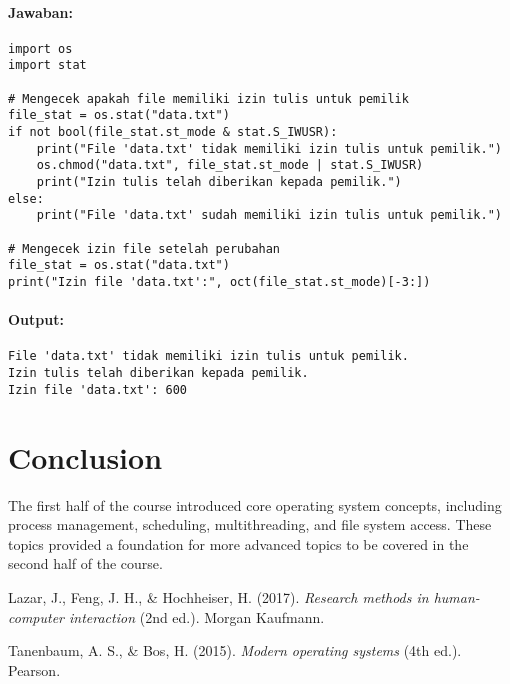 \documentclass[12pt]{article}
\begin{document}
\paragraph{Jawaban:}
\begin{verbatim}
import os
import stat

# Mengecek apakah file memiliki izin tulis untuk pemilik
file_stat = os.stat("data.txt")
if not bool(file_stat.st_mode & stat.S_IWUSR):
    print("File 'data.txt' tidak memiliki izin tulis untuk pemilik.")
    os.chmod("data.txt", file_stat.st_mode | stat.S_IWUSR)
    print("Izin tulis telah diberikan kepada pemilik.")
else:
    print("File 'data.txt' sudah memiliki izin tulis untuk pemilik.")

# Mengecek izin file setelah perubahan
file_stat = os.stat("data.txt")
print("Izin file 'data.txt':", oct(file_stat.st_mode)[-3:])
\end{verbatim}

\paragraph{Output:}
\begin{verbatim}
File 'data.txt' tidak memiliki izin tulis untuk pemilik.
Izin tulis telah diberikan kepada pemilik.
Izin file 'data.txt': 600
\end{verbatim}



\section{Conclusion}
The first half of the course introduced core operating system concepts, including process management, scheduling, multithreading, and file system access. These topics provided a foundation for more advanced topics to be covered in the second half of the course.

\begin{thebibliography}{9}

    Lazar, J., Feng, J. H., \& Hochheiser, H. (2017). \textit{Research methods in human-computer interaction} (2nd ed.). Morgan Kaufmann.

    Tanenbaum, A. S., \& Bos, H. (2015). \textit{Modern operating systems} (4th ed.). Pearson.

\end{thebibliography}
\end{document}
